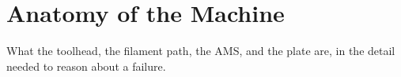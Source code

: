
\chapter{Anatomy of the Machine}

 What the toolhead, the filament path, the AMS, and
the plate are, in the detail needed to reason about a failure.

